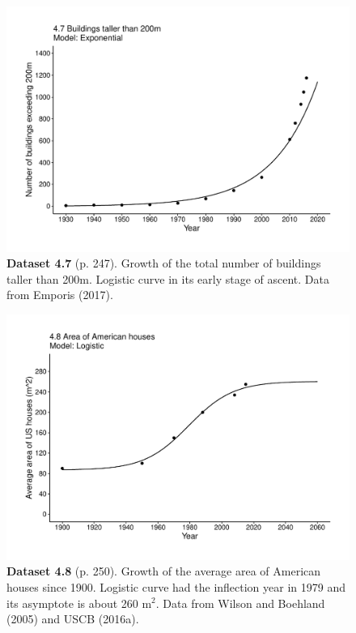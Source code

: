 \documentclass[aps,rmp,preprint,superscriptaddress,10pt,onecolumn]{article}
\begin{document}
\clearpage
\begin{figure}[h]
\includegraphics[width=\textwidth]{output/figs-ggplot/4.7.pdf}
\caption*{\textbf{Dataset 4.7} (p. 247). Growth of the total number of buildings taller than 200m. Logistic curve in its early stage of ascent. Data from Emporis (2017).}
\end{figure}
	
\clearpage
\begin{figure}[h]
\includegraphics[width=\textwidth]{output/figs-ggplot/4.8.pdf}
\caption*{\textbf{Dataset 4.8} (p. 250). Growth of the average area of American houses since 1900. Logistic curve had the inflection year in 1979 and its asymptote is about 260 m$^2$. Data from Wilson and Boehland (2005) and USCB (2016a).}
\end{figure}
	
\end{document}
